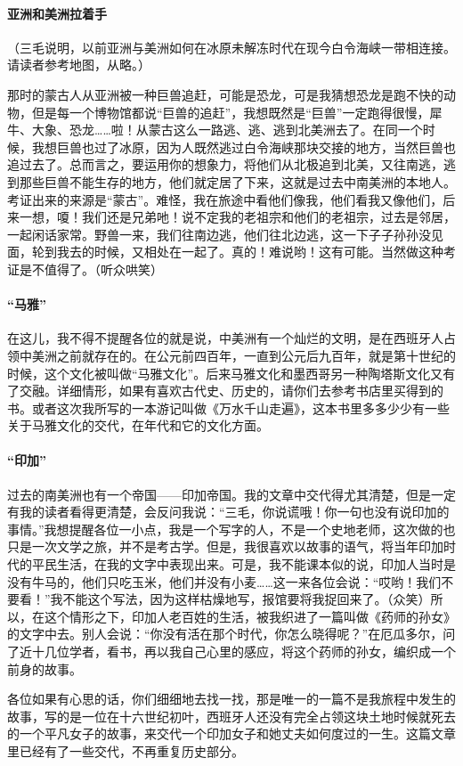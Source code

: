 \paragraph*{亚洲和美洲拉着手}
\par （三毛说明，以前亚洲与美洲如何在冰原未解冻时代在现今白令海峡一带相连接。请读者参考地图，从略。）
\par 那时的蒙古人从亚洲被一种巨兽追赶，可能是恐龙，可是我猜想恐龙是跑不快的动物，但是每一个博物馆都说“巨兽的追赶”，我想既然是“巨兽”一定跑得很慢，犀牛、大象、恐龙……啦！从蒙古这么一路逃、逃、逃到北美洲去了。在同一个时候，我想巨兽也过了冰原，因为人既然逃过白令海峡那块交接的地方，当然巨兽也追过去了。总而言之，要运用你的想象力，将他们从北极追到北美，又往南逃，逃到那些巨兽不能生存的地方，他们就定居了下来，这就是过去中南美洲的本地人。考证出来的来源是“蒙古”。难怪，我在旅途中看他们像我，他们看我又像他们，后来一想，嗄！我们还是兄弟吔！说不定我的老祖宗和他们的老祖宗，过去是邻居，一起闲话家常。野兽一来，我们往南边逃，他们往北边逃，这一下子子孙孙没见面，轮到我去的时候，又相处在一起了。真的！难说哟！这有可能。当然做这种考证是不值得了。（听众哄笑）
\paragraph*{“马雅”}
\par 在这儿，我不得不提醒各位的就是说，中美洲有一个灿烂的文明，是在西班牙人占领中美洲之前就存在的。在公元前四百年，一直到公元后九百年，就是第十世纪的时候，这个文化被叫做“马雅文化”。后来马雅文化和墨西哥另一种陶塔斯文化又有了交融。详细情形，如果有喜欢古代史、历史的，请你们去参考书店里买得到的书。或者这次我所写的一本游记叫做《万水千山走遍》，这本书里多多少少有一些关于马雅文化的交代，在年代和它的文化方面。
\paragraph*{“印加”}
\par 过去的南美洲也有一个帝国——印加帝国。我的文章中交代得尤其清楚，但是一定有我的读者看得更清楚，会反问我说：“三毛，你说谎哦！你一句也没有说印加的事情。”我想提醒各位一小点，我是一个写字的人，不是一个史地老师，这次做的也只是一次文学之旅，并不是考古学。但是，我很喜欢以故事的语气，将当年印加时代的平民生活，在我的文字中表现出来。可是，我不能课本似的说，印加人当时是没有牛马的，他们只吃玉米，他们并没有小麦……这一来各位会说：“哎哟！我们不要看！”我不能这个写法，因为这样枯燥地写，报馆要将我捉回来了。（众笑）所以，在这个情形之下，印加人老百姓的生活，被我织进了一篇叫做《药师的孙女》的文字中去。别人会说：“你没有活在那个时代，你怎么晓得呢？”在厄瓜多尔，问了近十几位学者，看书，再以我自己心里的感应，将这个药师的孙女，编织成一个前身的故事。
\par 各位如果有心思的话，你们细细地去找一找，那是唯一的一篇不是我旅程中发生的故事，写的是一位在十六世纪初叶，西班牙人还没有完全占领这块土地时候就死去的一个平凡女子的故事，来交代一个印加女子和她丈夫如何度过的一生。这篇文章里已经有了一些交代，不再重复历史部分。

